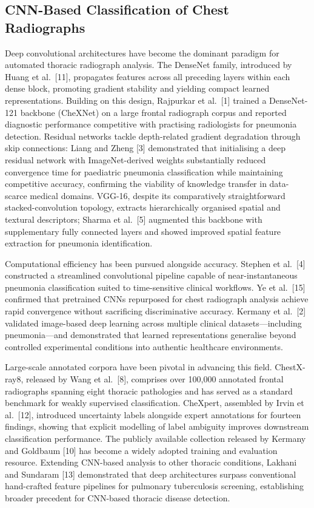 \documentclass[conference]{IEEEtran}
\begin{document}
\subsection{CNN-Based Classification of Chest Radiographs}

Deep convolutional architectures have become the dominant paradigm for automated thoracic radiograph analysis. The DenseNet family, introduced by Huang et al.\ [11], propagates features across all preceding layers within each dense block, promoting gradient stability and yielding compact learned representations. Building on this design, Rajpurkar et al.\ [1] trained a DenseNet-121 backbone (CheXNet) on a large frontal radiograph corpus and reported diagnostic performance competitive with practising radiologists for pneumonia detection. Residual networks tackle depth-related gradient degradation through skip connections: Liang and Zheng [3] demonstrated that initialising a deep residual network with ImageNet-derived weights substantially reduced convergence time for paediatric pneumonia classification while maintaining competitive accuracy, confirming the viability of knowledge transfer in data-scarce medical domains. VGG-16, despite its comparatively straightforward stacked-convolution topology, extracts hierarchically organised spatial and textural descriptors; Sharma et al.\ [5] augmented this backbone with supplementary fully connected layers and showed improved spatial feature extraction for pneumonia identification.

Computational efficiency has been pursued alongside accuracy. Stephen et al.\ [4] constructed a streamlined convolutional pipeline capable of near-instantaneous pneumonia classification suited to time-sensitive clinical workflows. Ye et al.\ [15] confirmed that pretrained CNNs repurposed for chest radiograph analysis achieve rapid convergence without sacrificing discriminative accuracy. Kermany et al.\ [2] validated image-based deep learning across multiple clinical datasets---including pneumonia---and demonstrated that learned representations generalise beyond controlled experimental conditions into authentic healthcare environments.

Large-scale annotated corpora have been pivotal in advancing this field. ChestX-ray8, released by Wang et al.\ [8], comprises over 100,000 annotated frontal radiographs spanning eight thoracic pathologies and has served as a standard benchmark for weakly supervised classification. CheXpert, assembled by Irvin et al.\ [12], introduced uncertainty labels alongside expert annotations for fourteen findings, showing that explicit modelling of label ambiguity improves downstream classification performance. The publicly available collection released by Kermany and Goldbaum [10] has become a widely adopted training and evaluation resource. Extending CNN-based analysis to other thoracic conditions, Lakhani and Sundaram [13] demonstrated that deep architectures surpass conventional hand-crafted feature pipelines for pulmonary tuberculosis screening, establishing broader precedent for CNN-based thoracic disease detection.
\end{document}
